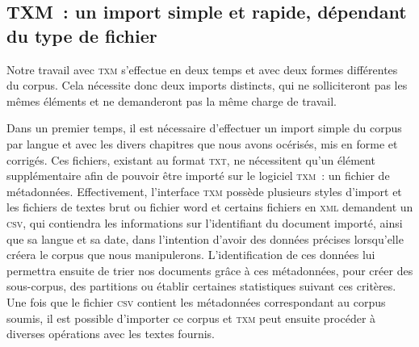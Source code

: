 \subsection{TXM~: un import simple et rapide, dépendant du type de fichier}
Notre travail avec \textsc{txm} s'effectue en deux temps et avec deux formes différentes du corpus. Cela nécessite donc deux imports distincts, qui ne solliciteront pas les mêmes éléments et ne demanderont pas la même charge de travail.

Dans un premier temps, il est nécessaire d'effectuer un import simple du corpus par langue et avec les divers chapitres que nous avons océrisés, mis en forme et corrigés. Ces fichiers, existant au format \textsc{txt}, ne nécessitent qu'un élément supplémentaire afin de pouvoir être importé sur le logiciel \textsc{txm}~: un fichier de métadonnées. Effectivement, l'interface \textsc{txm} possède plusieurs styles d'import et les fichiers de textes brut ou fichier word et certains fichiers en \textsc{xml} demandent un \textsc{csv}, qui contiendra les informations sur l'identifiant du document importé, ainsi que sa langue et sa date, dans l'intention d'avoir des données précises lorsqu'elle créera le corpus que nous manipulerons. L'identification de ces données lui permettra ensuite de trier nos documents grâce à ces métadonnées, pour créer des sous-corpus, des partitions ou établir certaines statistiques suivant ces critères. Une fois que le fichier \textsc{csv} contient les métadonnées correspondant au corpus soumis, il est possible d'importer ce corpus et \textsc{txm} peut ensuite procéder à diverses opérations avec les textes fournis.

